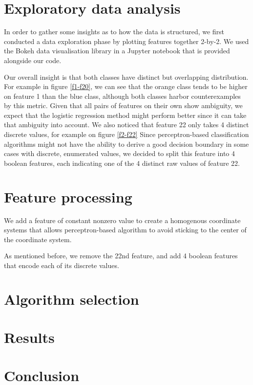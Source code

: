 \documentclass[10pt,conference,compsocconf]{IEEEtran}
\begin{document}
\section{Exploratory data analysis}
In order to gather some insights as to how the data is structured, we first conducted a data exploration phase by plotting features together 2-by-2.
We used the Bokeh data visualisation library in a Jupyter notebook that is provided alongside our code.

Our overall insight is that both classes have distinct but overlapping distribution. For example in figure \ref{f1-f20}, we can see that the orange class tends to be higher on feature 1 than the blue class, although both classes harbor counterexamples by this metric. Given that all pairs of features on their own show ambiguity, we expect that the logistic regression method might perform better since it can take that ambiguity into account. We also noticed that feature 22 only takes 4 distinct discrete values, for example on figure \ref{f2-f22} Since perceptron-based classification algorithms might not have the ability to derive a good decision boundary in some cases with discrete, enumerated values, we decided to split this feature into 4 boolean features, each indicating one of the 4 distinct raw values of feature 22.

\section{Feature processing}
We add a feature of constant nonzero value to create a homogenous coordinate systems that allows perceptron-based algorithm to avoid sticking to the center of the coordinate system.

As mentioned before, we remove the 22nd feature, and add 4 boolean features that encode each of its discrete values.
\section{Algorithm selection}
\section{Results}
\section{Conclusion}
\end{document}
